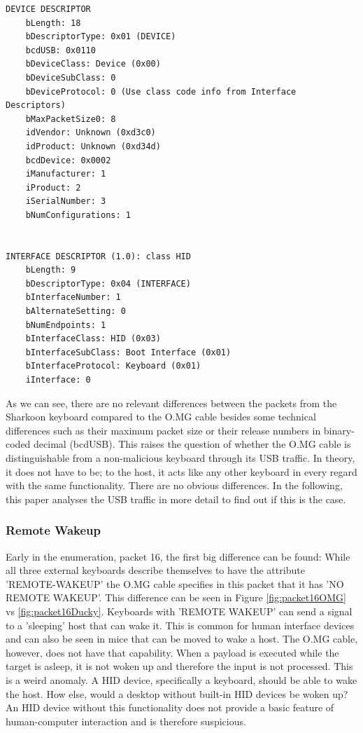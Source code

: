 \begin{lstlisting}[caption={Device and Interface Descriptor packet generated by an O.MG cable},captionpos=b]
DEVICE DESCRIPTOR
    bLength: 18
    bDescriptorType: 0x01 (DEVICE)
    bcdUSB: 0x0110
    bDeviceClass: Device (0x00)
    bDeviceSubClass: 0
    bDeviceProtocol: 0 (Use class code info from Interface Descriptors)
    bMaxPacketSize0: 8
    idVendor: Unknown (0xd3c0)
    idProduct: Unknown (0xd34d)
    bcdDevice: 0x0002
    iManufacturer: 1
    iProduct: 2
    iSerialNumber: 3
    bNumConfigurations: 1


INTERFACE DESCRIPTOR (1.0): class HID
    bLength: 9
    bDescriptorType: 0x04 (INTERFACE)
    bInterfaceNumber: 1
    bAlternateSetting: 0
    bNumEndpoints: 1
    bInterfaceClass: HID (0x03)
    bInterfaceSubClass: Boot Interface (0x01)
    bInterfaceProtocol: Keyboard (0x01)
    iInterface: 0
\end{lstlisting}

As we can see, there are no relevant differences between the packets from the Sharkoon keyboard compared to the O.MG cable besides some technical differences such as their maximum packet size or their release numbers in binary-coded decimal (bcdUSB). This raises the question of whether the O.MG cable is distinguishable
from a non-malicious keyboard through its USB traffic. In theory, it does not have to be; to the host, it acts like any other keyboard in every regard with the same functionality. There are no obvious differences. In the following, this paper analyses the USB traffic in more detail to find out if this is the case.


\subsubsection{Remote Wakeup}

Early in the enumeration, packet 16, the first big difference can be found: While all three external keyboards describe themselves to have the attribute 'REMOTE-WAKEUP' the O.MG cable specifies in this packet that it has 'NO REMOTE WAKEUP'. This difference can be seen in Figure \ref{fig:packet16OMG} vs \ref{fig:packet16Ducky}. Keyboards with 'REMOTE WAKEUP' can send a signal to a 'sleeping' host that can wake it. This is common for human interface devices and can also be seen in mice that can be moved to wake a host. The O.MG cable, however, does not have that capability. When a payload is executed while the target is asleep, it is not woken up and therefore the input is not processed. This is a weird anomaly. A HID device, specifically a keyboard, should be able to wake the host. How else, would a desktop without built-in HID devices be woken up? An HID device without this functionality does not provide a basic feature of human-computer interaction and is therefore suspicious.

